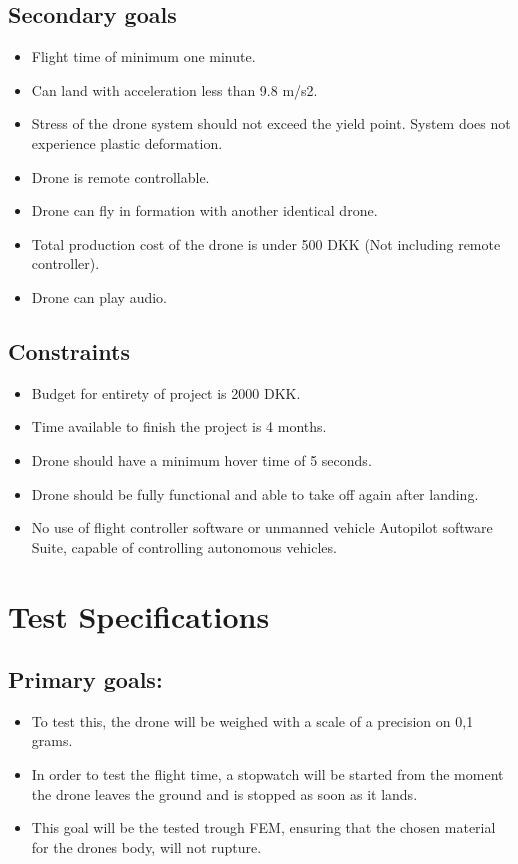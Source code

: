 \documentclass[a4paper,11pt]{article}
\begin{document}
\subsection{Secondary goals}
\begin{itemize}
    \item
          Flight time of minimum one minute.
    \item
          Can land with acceleration less than 9.8 m/s2.
    \item
          Stress of the drone system should not exceed the yield point. System does not experience plastic deformation.
    \item
          Drone is remote controllable.
    \item
          Drone can fly in formation with another identical drone.
    \item
          Total production cost of the drone is under 500 DKK (Not including remote controller).
    \item
          Drone can play audio.
\end{itemize}



\subsection{Constraints}

\begin{itemize}
    \item
          Budget for entirety of project is 2000 DKK.
    \item
          Time available to finish the project is 4 months.
    \item
          Drone should have a minimum hover time of 5 seconds.
    \item
          Drone should be fully functional and able to take off again after landing.
    \item
          No use of flight controller software or unmanned vehicle Autopilot software Suite, capable of controlling autonomous vehicles.
\end{itemize}


\section {Test Specifications}
\subsection{Primary goals:}
\begin{itemize}
    \item
          To test this, the drone will be weighed with a scale of a precision on 0,1 grams.
    \item
          In order to test the flight time, a stopwatch will be started from the moment the drone leaves the ground and is stopped as soon as it lands.
    \item
          This goal will be the tested trough FEM, ensuring that the chosen material for the drones body, will not rupture.
\end{itemize}
\end{document}
